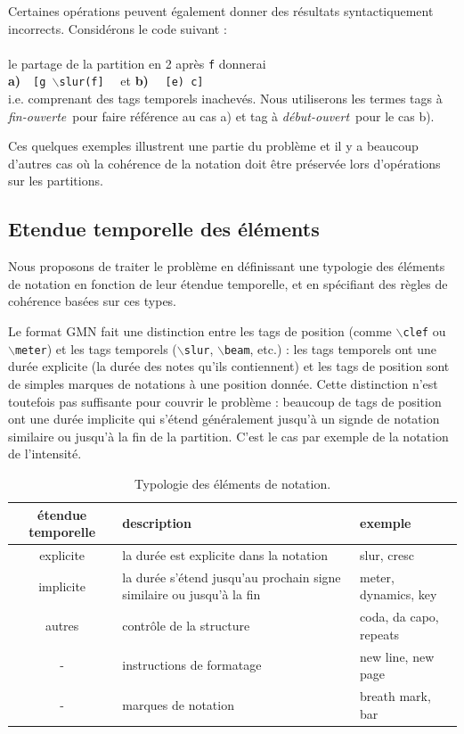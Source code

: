 \documentclass{article}
\newcommand{\code}[1]		{{\small \texttt{#1}}}
\newcommand{\gtag}[1]		{$\backslash$\code{#1}}
\newcommand{\oend}			{\emph{fin-ouverte}}
\newcommand{\obeg}			{\emph{début-ouvert}}
\newcommand{\codeindent}	{\\ \hspace*{9mm}}
\begin{document}
Certaines opérations peuvent également donner des résultats syntactiquement incorrects. Considérons le code suivant :
\codeindent \code{[g \gtag{slur}(f e) c]} \\
le partage de la partition en 2 après \code{f} donnerai 
\codeindent \textbf{a)}\ \ \code{[g \gtag{slur}(f]} \ \  et \textbf{b)} \ \  \code{[e) c]} \\
i.e. comprenant des tags temporels inachevés. Nous utiliserons les termes tags à \oend\ pour faire référence au cas a) et tag à \obeg\ pour le cas b).

Ces quelques exemples illustrent une partie du problème et il y a beaucoup d'autres cas où la cohérence de la notation doit être préservée lors d'opérations sur les partitions.

\subsection{Etendue temporelle des éléments}
Nous proposons de traiter le problème en définissant une typologie des éléments de notation en fonction de leur étendue temporelle, et en spécifiant des règles de cohérence basées sur ces types.

Le format GMN fait une distinction entre les tags de position (comme \gtag{clef} ou \gtag{meter}) et les tags temporels (\gtag{slur}, \gtag{beam}, etc.) : les tags temporels ont une durée explicite (la durée des notes qu'ils contiennent) et les tags de position sont de simples marques de notations à une position donnée. Cette distinction n'est toutefois pas suffisante pour couvrir le problème : beaucoup de tags de position ont une durée implicite qui s'étend généralement jusqu'à un signde de notation similaire ou jusqu'à la fin de la partition. C'est le cas par exemple de la notation de l'intensité.
\begin{table}[htdp]
\begin{center}
\begin{tabular}{cll}
étendue temporelle & description & exemple \\
\hline
explicite 	& la durée est explicite dans la notation	& slur, cresc \\
implicite 	& la durée s'étend jusqu'au prochain signe similaire ou jusqu'à la fin	& meter, dynamics, key \\
autres 		& contrôle de la structure			& coda, da capo, repeats\\
	- 		& instructions	 de formatage 	& new line, new page \\
	- 		& marques de notation & breath mark, bar \\
\hline
\end{tabular}
\end{center}
\caption{Typologie des éléments de notation.}
\label{types}
\end{table}
\end{document}
